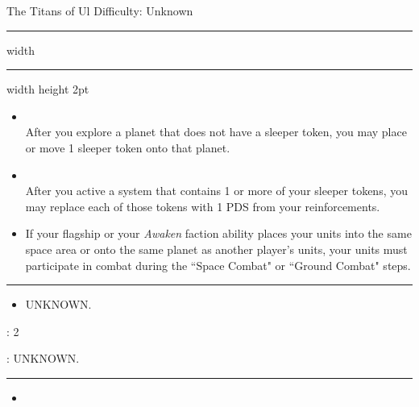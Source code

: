 {\handel\Huge The Titans of Ul} \hfill {\Large Difficulty: Unknown} \vspace{-4pt}\\
\hrule width \hsize \kern 1mm \hrule width \hsize height 2pt


\begin{multicols}{2}


\begin{itemize}
\item {}\\
After you explore a planet that does not have a sleeper token, you may place or move 1 sleeper token onto that planet.
\item {}\\
After you active a system that contains 1 or more of your sleeper tokens, you may replace each of those tokens with 1 PDS from your reinforcements.
\item {} If your flagship or your \emph{Awaken} faction ability places your units into the same space area or onto the same planet as another player’s units, your units must participate in combat during the ``Space Combat" or ``Ground Combat" steps. 
\end{itemize}


\vspace{-10pt}\rule{\hsize}{0.4pt}\vspace{5pt}


\vspace{-5pt}
\begin{multicols}{2}
\begin{itemize}
\item UNKNOWN. %
\end{itemize}
\end{multicols}

\vspace{-5pt}
: 2

\vspace{2pt}
: UNKNOWN. %

\rule{\hsize}{0.4pt}\vspace{5pt}


\begin{itemize}
\item \magen
\end{itemize}


\end{multicols}
